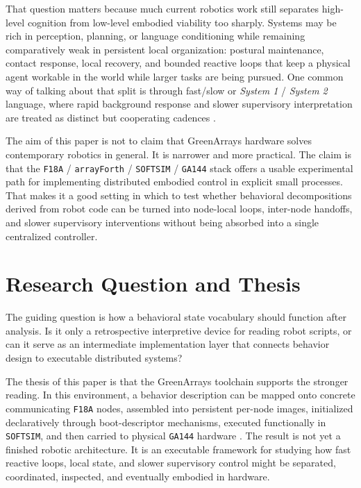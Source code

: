 \documentclass[11pt]{article}
\begin{document}
That question matters because much current robotics work still separates
high-level cognition from low-level embodied viability too sharply. Systems
may be rich in perception, planning, or language conditioning while
remaining comparatively weak in persistent local organization: postural
maintenance, contact response, local recovery, and bounded reactive loops
that keep a physical agent workable in the world while larger tasks are
being pursued. One common way of talking about that split is through
fast/slow or \emph{System 1} / \emph{System 2} language, where rapid
background response and slower supervisory interpretation are treated as
distinct but cooperating cadences \citep{kahneman2011thinking,wang2025hume}.

The aim of this paper is not to claim that GreenArrays hardware solves
contemporary robotics in general. It is narrower and more practical. The
claim is that the \texttt{F18A} / \texttt{arrayForth} /
\texttt{SOFTSIM} / \texttt{GA144} stack offers a usable experimental path
for implementing distributed embodied control in explicit small processes.
That makes it a good setting in which to test whether behavioral
decompositions derived from robot code can be turned into node-local loops,
inter-node handoffs, and slower supervisory interventions without being
absorbed into a single centralized controller.

\section{Research Question and Thesis}

The guiding question is how a behavioral state vocabulary should function
after analysis. Is it only a retrospective interpretive device for reading
robot scripts, or can it serve as an intermediate implementation layer that
connects behavior design to executable distributed systems?

The thesis of this paper is that the GreenArrays toolchain supports the
stronger reading. In this environment, a behavior description can be mapped
onto concrete communicating \texttt{F18A} nodes, assembled into persistent
per-node images, initialized declaratively through boot-descriptor
mechanisms, executed functionally in \texttt{SOFTSIM}, and then carried to
physical \texttt{GA144} hardware \citep{greenarrays2011db001,greenarrays2011db013}. The
result is not yet a finished robotic architecture. It is an executable
framework for studying how fast reactive loops, local state, and slower
supervisory control might be separated, coordinated, inspected, and
eventually embodied in hardware.
\end{document}
